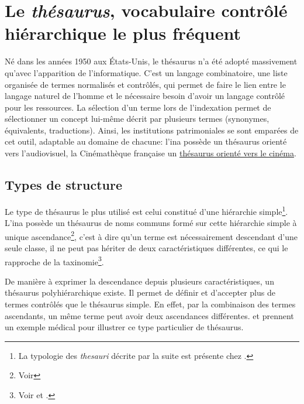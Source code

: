 \section{\label{I-C-2}Le \textit{thésaurus}, vocabulaire contrôlé hiérarchique le plus fréquent}

Né dans les années 1950 aux États-Unis, le thésaurus n'a été adopté massivement qu'avec l'apparition de l'informatique. C'est un langage combinatoire, une liste organisée de termes normalisés et contrôlés, qui permet de faire le lien entre le langage naturel de l'homme et le nécessaire besoin d'avoir un langage contrôlé pour les ressources. La sélection d'un terme lors de l'indexation permet de sélectionner un concept lui-même décrit par plusieurs termes (synonymes, équivalents, traductions). Ainsi, les institutions patrimoniales se sont emparées de cet outil, adaptable au domaine de chacune: l'\ac{ina} possède un thésaurus orienté vers l'audiovisuel, la Cinémathèque française un \href{http://www.cineressources.net/thesaurus/}{thésaurus orienté vers le cinéma}.

\subsection{\label{I-C-2-a}Types de structure}

Le type de thésaurus le plus utilisé est celui constitué d'une hiérarchie simple\footnote{La typologie des \textit{thesauri} décrite par la suite est présente chez \cite{rosenfeld_information_2015}.}. L'\ac{ina} possède un thésaurus de noms communs formé sur cette hiérarchie simple à unique ascendance\footnote{Voir }, c'est à dire qu'un terme est nécessairement descendant d'une seule classe, il ne peut pas hériter de deux caractéristiques différentes, ce qui le rapproche de la taxinomie\footnote{Voir  et .}.

 

De manière à exprimer la descendance depuis plusieurs caractéristiques, un thésaurus polyhiérarchique existe. Il permet de définir et d'accepter plus de termes contrôlés que le thésaurus simple. En effet, par la combinaison des termes ascendants, un même terme peut avoir deux ascendances différentes.  et  prennent un exemple médical pour illustrer ce type particulier de thésaurus.


